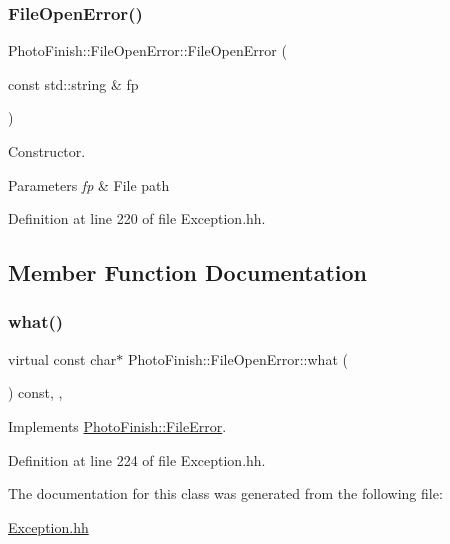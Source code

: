 \subsubsection{\texorpdfstring{File\+Open\+Error()}{FileOpenError()}\hspace{0.1cm}{\footnotesize\ttfamily [2/2]}}
{\footnotesize\ttfamily Photo\+Finish\+::\+File\+Open\+Error\+::\+File\+Open\+Error (\begin{DoxyParamCaption}\item[{const std\+::string \&}]{fp }\end{DoxyParamCaption})\hspace{0.3cm}{\ttfamily [inline]}}



Constructor. 


\begin{DoxyParams}{Parameters}
{\em fp} & File path \\
\hline
\end{DoxyParams}


Definition at line 220 of file Exception.\+hh.



\subsection{Member Function Documentation}
\mbox{\label{class_photo_finish_1_1_file_open_error_ab88924bbaf53b4ba6efda71d7a4d4baf}} 
\subsubsection{\texorpdfstring{what()}{what()}}
{\footnotesize\ttfamily virtual const char$\ast$ Photo\+Finish\+::\+File\+Open\+Error\+::what (\begin{DoxyParamCaption}{ }\end{DoxyParamCaption}) const\hspace{0.3cm}{\ttfamily [inline]}, {\ttfamily [virtual]}, {\ttfamily [noexcept]}}



Implements \hyperlink{class_photo_finish_1_1_file_error_ac4da80387c770aa95858dae8aac9a81e}{Photo\+Finish\+::\+File\+Error}.



Definition at line 224 of file Exception.\+hh.



The documentation for this class was generated from the following file\+:\begin{DoxyCompactItemize}
\item 
\hyperlink{_exception_8hh}{Exception.\+hh}\end{DoxyCompactItemize}
